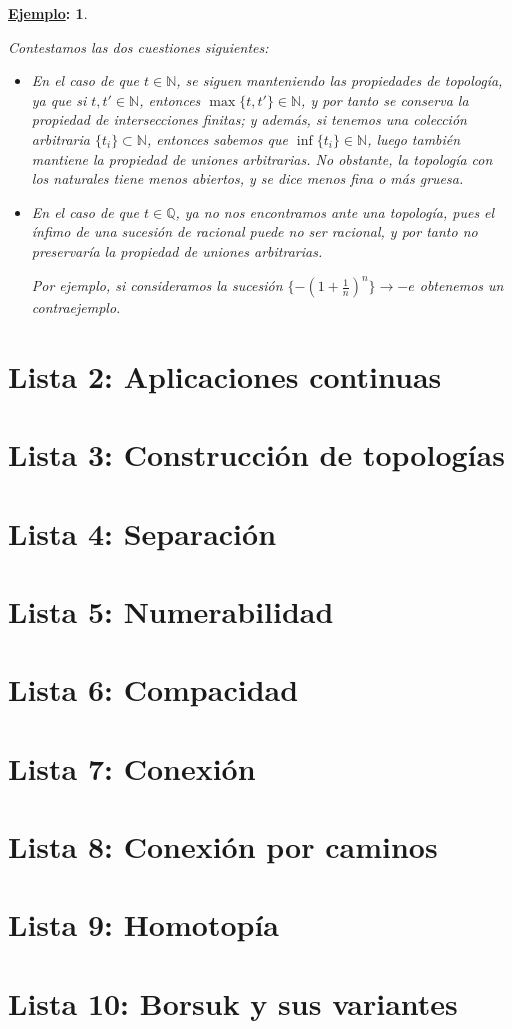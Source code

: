 \documentclass[10pt,a4paper,openright]{book}
\theoremstyle{break}
\newtheorem*{ej}{\underline{Ejemplo}:}
\begin{document}
\begin{ej}
\begin{enumerate}[label={(\arabic*)}]
\end{enumerate}
Contestamos las dos cuestiones siguientes:
\begin{itemize}
\item En el caso de que $t \in \mathbb{N}$, se siguen manteniendo las propiedades de topología, ya que si $t,t' \in \mathbb{N}$, entonces $\max \{t,t'\} \in \mathbb{N}$, y por tanto se conserva la propiedad de intersecciones finitas; y además, si tenemos una colección arbitraria $\{t_i\} \subset \mathbb{N}$, entonces sabemos que $\inf \{t_i\} \in \mathbb{N}$, luego también mantiene la propiedad de uniones arbitrarias. No obstante, la topología con los naturales tiene menos abiertos, y se dice menos fina o más gruesa.
\item En el caso de que $t \in \mathbb{Q}$, ya no nos encontramos ante una topología, pues el ínfimo de una sucesión de racional puede no ser racional, y por tanto no preservaría la propiedad de uniones arbitrarias.

Por ejemplo, si consideramos la sucesión $\displaystyle \lbrace - \left(1 + \frac{1}{n} \right)^n \} \longrightarrow -e$ obtenemos un contraejemplo.
\end{itemize}
\end{ej}
\chapter{Lista 2: Aplicaciones continuas}%
\label{cha:lista2}

\chapter{Lista 3: Construcción de topologías}%
\label{cha:lista3}

\chapter{Lista 4: Separación}%
\label{cha:lista4}

\chapter{Lista 5: Numerabilidad}%
\label{cha:lista5}

\chapter{Lista 6: Compacidad}%
\label{cha:lista6}

\chapter{Lista 7: Conexión}%
\label{cha:lista7}

\chapter{Lista 8: Conexión por caminos}%
\label{cha:lista8}

\chapter{Lista 9: Homotopía}%
\label{cha:lista9}

\chapter{Lista 10: Borsuk y sus variantes}%
\label{cha:lista10}
\end{document}

